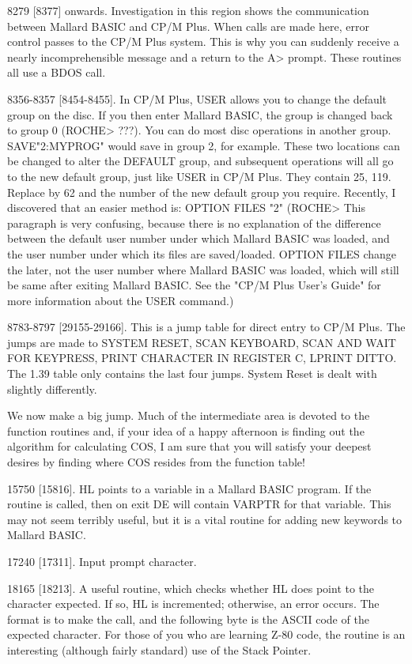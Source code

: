 8279  [8377]  onwards. Investigation in this region  shows  the  communication 
between  Mallard BASIC and CP/M Plus. When calls are made here, error  control 
passes to the CP/M Plus system. This is why you can suddenly receive a  nearly 
incomprehensible message and a return to the A> prompt. These routines all use 
a BDOS call.

8356-8357  [8454-8455].  In CP/M Plus, USER allows you to change  the  default 
group on the disc. If you then enter Mallard BASIC, the group is changed  back 
to  group  0 (ROCHE> ???). You can do most disc operations in  another  group. 
SAVE"2:MYPROG" would save in group 2, for example. These two locations can  be 
changed  to alter the DEFAULT group, and subsequent operations will all go  to 
the  new  default group, just like USER in CP/M Plus. They  contain  25,  119. 
Replace by 62 and the number of the new default group you require. Recently, I 
discovered  that an easier method is: OPTION FILES "2" (ROCHE> This  paragraph 
is  very confusing, because there is no explanation of the difference  between 
the  default  user number under which Mallard BASIC was loaded, and  the  user 
number under which its files are saved/loaded. OPTION FILES change the  later, 
not  the user number where Mallard BASIC was loaded, which will still be  same 
after  exiting  Mallard  BASIC.  See the "CP/M Plus  User's  Guide"  for  more 
information about the USER command.)

8783-8797  [29155-29166]. This is a jump table for direct entry to CP/M  Plus. 
The jumps are made to SYSTEM RESET, SCAN KEYBOARD, SCAN AND WAIT FOR KEYPRESS, 
PRINT CHARACTER IN REGISTER C, LPRINT DITTO. The 1.39 table only contains  the 
last four jumps. System Reset is dealt with slightly differently.

We  now  make  a big jump. Much of the intermediate area  is  devoted  to  the 
function  routines and, if your idea of a happy afternoon is finding  out  the 
algorithm  for calculating COS, I am sure that you will satisfy  your  deepest 
desires by finding where COS resides from the function table!

15750  [15816].  HL points to a variable in a Mallard BASIC  program.  If  the 
routine is called, then on exit DE will contain VARPTR for that variable. This 
may  not  seem  terribly  useful, but it is a vital  routine  for  adding  new 
keywords to Mallard BASIC.

17240 [17311]. Input prompt character.

18165  [18213].  A useful routine, which checks whether HL does point  to  the 
character expected. If so, HL is incremented; otherwise, an error occurs.  The 
format  is to make the call, and the following byte is the ASCII code  of  the 
expected  character. For those of you who are learning Z-80 code, the  routine 
is an interesting (although fairly standard) use of the Stack Pointer.

